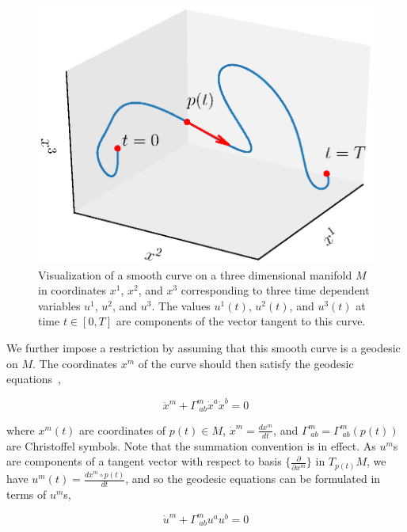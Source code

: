 \documentclass[a4paper,11pt]{elsarticle}
\begin{document}
\begin{figure}[h]
  \centering
  \includegraphics[scale=0.6, bb=0 0 461 346,trim={1cm 1cm 1cm 2cm},clip]{visualization.eps}
  \caption{Visualization of a smooth curve on a three dimensional
    manifold $M$ in coordinates $x^{1}$, $x^{2}$, and $x^{3}$
    corresponding to three time dependent variables $u^{1}$, $u^{2}$,
    and $u^{3}$. The values $u^{1}(t)$, $u^{2}(t)$, and $u^{3}(t)$ at
    time $t \in [0,T]$ are components of the vector tangent to this
    curve.}
  \label{fig:visualization}
\end{figure}

We further impose a restriction by assuming that this smooth curve is a
geodesic on $M$. The coordinates $x^{m}$ of the curve should then
satisfy the geodesic equations~\cite{deFelice-1990, schrodinger-1985},

\begin{equation}\label{eqn:geodesic-x}
\ddot{x}^{m} + \Gamma^{m}_{\;ab} \dot{x}^{a} \dot{x}^{b} = 0
\end{equation}

where $x^{m}(t)$ are coordinates of $p(t) \in M$, $\dot{x}^{m} =
\frac{dx^{m}}{dt}$, and $\Gamma^{m}_{\;ab} = \Gamma^{m}_{\;ab}(p(t))$
are Christoffel symbols. Note that the summation convention is in
effect. As $u^{m}$s are components of a tangent vector with respect to
basis $\{\frac{\partial}{\partial{x^{m}}}\}$ in $T_{p(t)}M$, we have
$u^{m}(t) = \frac{dx^{m} \circ p(t)}{dt}$, and so the geodesic
equations can be formulated in terms of $u^{m}$s,

\begin{equation}\label{eqn:geodesic}
\dot{u}^{m} + \Gamma^{m}_{\;ab} u^{a} u^{b} = 0
\end{equation}
\end{document}
